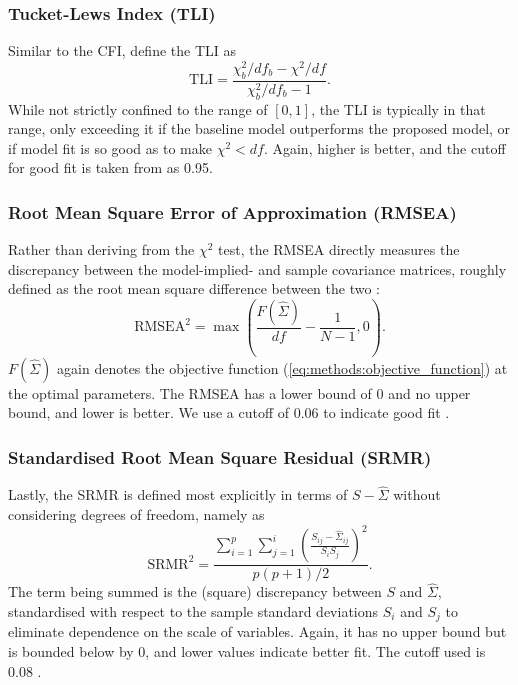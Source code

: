 \subsubsection{Tucket-Lews Index (TLI)}
Similar to the CFI,  define the TLI as
\begin{equation}
    \text{TLI} = \frac{\chi_b^2 / df_b - \chi^2 / df}{\chi_b^2 / df_b - 1}.
\end{equation}
While not strictly confined to the range of $[0, 1]$, the TLI is typically in that range, only exceeding it
if the baseline model outperforms the proposed model, or if model fit is so good as to make $\chi^2 < df$.
Again, higher is better, and the cutoff for good fit is taken from  as 0.95.

\subsubsection{Root Mean Square Error of Approximation (RMSEA)}
Rather than deriving from the $\chi^2$ test, the RMSEA directly measures the discrepancy between the model-implied- and
sample covariance matrices, roughly defined as the root mean square difference between the two \cite{schermelleh2003evaluating}:
\begin{equation}
    \text{RMSEA}^2 = \max(\frac{F(\hat{\Sigma})}{df} - \frac{1}{N - 1}, 0).
\end{equation}
$F(\hat{\Sigma})$ again denotes the objective function (\cref{eq:methods:objective_function}) at the optimal parameters.
The RMSEA has a lower bound of 0 and no upper bound, and lower is better. We use a cutoff of 0.06 to indicate good fit
\cite{hu1999cutoff}.

\subsubsection{Standardised Root Mean Square Residual (SRMR)}
Lastly, the SRMR is defined most explicitly in terms of $S - \hat{\Sigma}$ without considering degrees of freedom,
namely as \cite{schermelleh2003evaluating}
\begin{equation}
    \text{SRMR}^2 = \frac{\sum_{i=1}^p\sum_{j=1}^i (\frac{S_{ij} - \hat{\Sigma}_{ij}}{S_i S_j})^2}{p(p+1)/2}.
\end{equation}
The term being summed is the (square) discrepancy between $S$ and $\hat{\Sigma}$, standardised with respect to the sample standard
deviations $S_i$ and $S_j$ to eliminate dependence on the scale of variables.
Again, it has no upper bound but is bounded below by 0, and lower values indicate better fit.
The cutoff used is 0.08 \cite{hu1999cutoff}.

